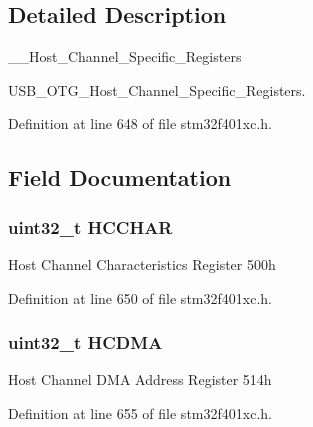 \subsection{Detailed Description}
\+\_\+\+\_\+\+Host\+\_\+\+Channel\+\_\+\+Specific\+\_\+\+Registers 

U\+S\+B\+\_\+\+O\+T\+G\+\_\+\+Host\+\_\+\+Channel\+\_\+\+Specific\+\_\+\+Registers. 

Definition at line 648 of file stm32f401xc.\+h.



\subsection{Field Documentation}
\subsubsection[{\texorpdfstring{H\+C\+C\+H\+AR}{HCCHAR}}]{ uint32\+\_\+t H\+C\+C\+H\+AR}\hypertarget{struct_u_s_b___o_t_g___host_channel_type_def_ac1d0619a44758dcaeeda5c0b9c22f784}{}\label{struct_u_s_b___o_t_g___host_channel_type_def_ac1d0619a44758dcaeeda5c0b9c22f784}
Host Channel Characteristics Register 500h 

Definition at line 650 of file stm32f401xc.\+h.

\subsubsection[{\texorpdfstring{H\+C\+D\+MA}{HCDMA}}]{ uint32\+\_\+t H\+C\+D\+MA}\hypertarget{struct_u_s_b___o_t_g___host_channel_type_def_af294702e1d54fe06b43e7a3b4033dc2e}{}\label{struct_u_s_b___o_t_g___host_channel_type_def_af294702e1d54fe06b43e7a3b4033dc2e}
Host Channel D\+MA Address Register 514h 

Definition at line 655 of file stm32f401xc.\+h.

